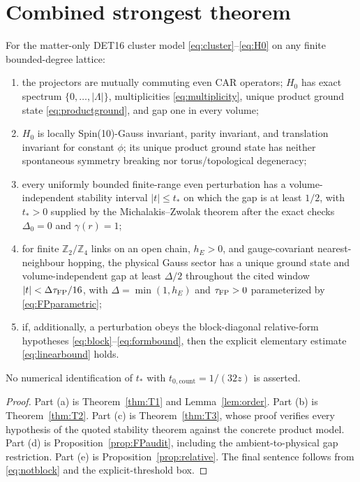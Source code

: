 \section{Combined strongest theorem}

\begin{theorem}
\label{thm:main}
For the matter-only DET16 cluster model
\eqref{eq:cluster}--\eqref{eq:H0} on any finite bounded-degree lattice:
\begin{enumerate}[label=\textup{(\alph*)}]
\item the projectors are mutually commuting even CAR operators;
$H_0$ has exact spectrum $\{0,\ldots,|\Lambda|\}$, multiplicities
\eqref{eq:multiplicity}, unique product ground state
\eqref{eq:productground}, and gap one in every volume;
\item $H_0$ is locally Spin(10)-Gauss invariant, parity invariant, and
translation invariant for constant $\phi$; its unique product ground
state has neither spontaneous symmetry breaking nor torus/topological
degeneracy;
\item every uniformly bounded finite-range even perturbation has a
volume-independent stability interval $|t|\leq t_*$ on which the gap
is at least $1/2$, with $t_*>0$ supplied by the
Michalakis--Zwolak theorem after the exact checks
$\Delta_0=0$ and $\gamma(r)=1$;
\item for finite $\mathbb Z_2/\mathbb Z_4$ links on an open chain,
$h_E>0$, and gauge-covariant nearest-neighbour hopping, the physical
Gauss sector has a unique ground state and volume-independent gap at
least $\Delta/2$ throughout the cited window
$|t|<\Delta\tau_{\rm FP}/16$, with
$\Delta=\min(1,h_E)$ and $\tau_{\rm FP}>0$ parameterized by
\eqref{eq:FPparametric};
\item if, additionally, a perturbation obeys the block-diagonal
relative-form hypotheses \eqref{eq:block}--\eqref{eq:formbound}, then
the explicit elementary estimate \eqref{eq:linearbound} holds.
\end{enumerate}
No numerical identification of $t_*$ with
$t_{0,\mathrm{count}}=1/(32z)$ is asserted.
\end{theorem}

\begin{proof}
Part (a) is Theorem~\ref{thm:T1} and Lemma~\ref{lem:order}.
Part (b) is Theorem~\ref{thm:T2}.  Part (c) is
Theorem~\ref{thm:T3}, whose proof verifies every hypothesis of the
quoted stability theorem against the concrete product model.  Part
(d) is Proposition~\ref{prop:FPaudit}, including the ambient-to-physical
gap restriction.  Part (e) is Proposition~\ref{prop:relative}.  The
final sentence follows from \eqref{eq:notblock} and the
explicit-threshold box.
\end{proof}

